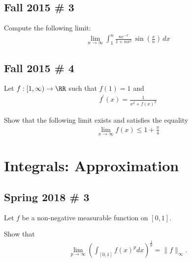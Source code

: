 \hypertarget{fall-2015-3}{%
\subsection{Fall 2015 \# 3}\label{fall-2015-3}}

Compute the following limit:
\begin{align*}
\lim _{n \rightarrow \infty} \int_{1}^{n} \frac{n e^{-x}}{1+n x^{2}} \, \sin \left(\frac x n\right) \, dx
\end{align*}

\hypertarget{fall-2015-4}{%
\subsection{Fall 2015 \# 4}\label{fall-2015-4}}

Let \(f: [1, \infty) \to \RR\) such that \(f(1) = 1\) and
\begin{align*}
f^{\prime}(x)= \frac{1} {x^{2}+f(x)^{2}}
\end{align*}

Show that the following limit exists and satisfies the equality
\begin{align*}
\lim _{x \rightarrow \infty} f(x) \leq 1 + \frac \pi 4
\end{align*}

\hypertarget{integrals-approximation}{%
\section{Integrals: Approximation}\label{integrals-approximation}}

\hypertarget{spring-2018-3}{%
\subsection{Spring 2018 \# 3}\label{spring-2018-3}}

Let \(f\) be a non-negative measurable function on \([0, 1]\).

Show that
\begin{align*}
\lim _{p \rightarrow \infty}\left(\int_{[0,1]} f(x)^{p} d x\right)^{\frac{1}{p}}=\|f\|_{\infty}.
\end{align*}


